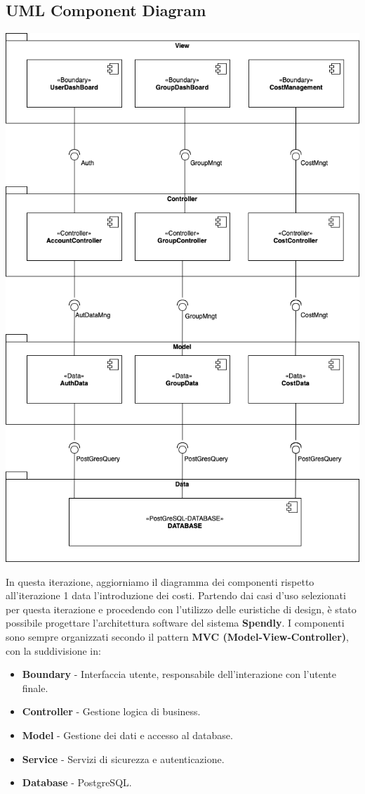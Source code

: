 \subsection{UML Component Diagram}

\begin{center}
    \includegraphics[scale=0.45]{images/ComponentDiagramV1.3.png}
\end{center}

In questa iterazione, aggiorniamo il diagramma dei componenti rispetto all'iterazione 1 data l'introduzione dei costi. 
Partendo dai casi d’uso selezionati per questa iterazione e procedendo con l’utilizzo delle euristiche di design, è stato possibile progettare l’architettura software del sistema \textbf{Spendly}.  
I componenti sono sempre organizzati secondo il pattern \textbf{MVC (Model-View-Controller)}, con la suddivisione in:
\begin{itemize}
    \item \textbf{Boundary} - Interfaccia utente, responsabile dell'interazione con l'utente finale.
    \item \textbf{Controller} - Gestione logica di business.
    \item \textbf{Model} - Gestione dei dati e accesso al database.
    \item \textbf{Service} - Servizi di sicurezza e autenticazione.
    \item \textbf{Database} - PostgreSQL.
\end{itemize}
